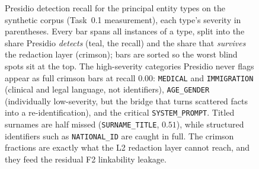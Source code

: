 \begin{figure}[htbp]
  \caption[Per-entity-type Presidio detection recall]{Presidio detection recall for the principal
  entity types on the synthetic corpus (Task~0.1 measurement), each type's severity in parentheses.
  Every bar spans all instances of a type, split into the share Presidio \emph{detects} (teal, the recall)
  and the share that \emph{survives} the redaction layer (crimson); bars are sorted so the worst blind
  spots sit at the top. The high-severity categories Presidio never flags appear as full crimson bars at
  recall $0.00$: \texttt{MEDICAL} and \texttt{IMMIGRATION} (clinical and legal language, not identifiers),
  \texttt{AGE\_GENDER} (individually low-severity, but the bridge that turns scattered facts into a
  re-identification), and the critical \texttt{SYSTEM\_PROMPT}. Titled surnames are half missed
  (\texttt{SURNAME\_TITLE}, $0.51$), while structured identifiers such as \texttt{NATIONAL\_ID} are caught
  in full. The crimson fractions are exactly what the L2 redaction layer cannot reach, and they feed the
  residual F2 linkability leakage.}
  \label{fig:ch5-entity-recall}
\end{figure}
